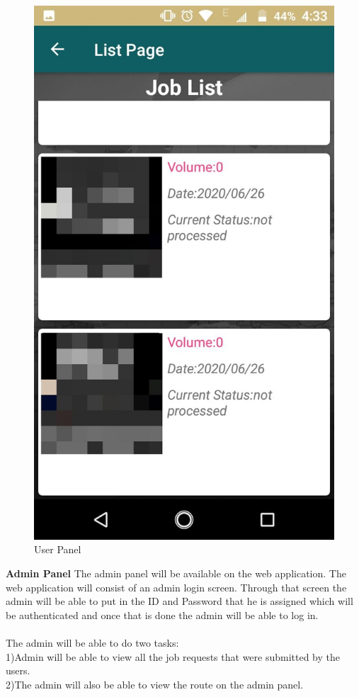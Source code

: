 \begin{figure}[!hb]
   \includegraphics[scale=0.2]{images/5.png}
 
   
 
   \caption{User Panel}\label{fig:picture}
\end{figure}

\textbf{Admin Panel}
The admin panel will be available on the web application. The web application will consist of an admin login screen. Through that screen the admin will be able to put in the ID and Password that he is assigned which will be authenticated and once that is done the admin will be able to log in.\\
\\
The admin will be able to do two tasks:\\
1)Admin will be able to view all the job requests that were submitted by the users.\\
2)The admin will also be able to view the route on the admin panel.

